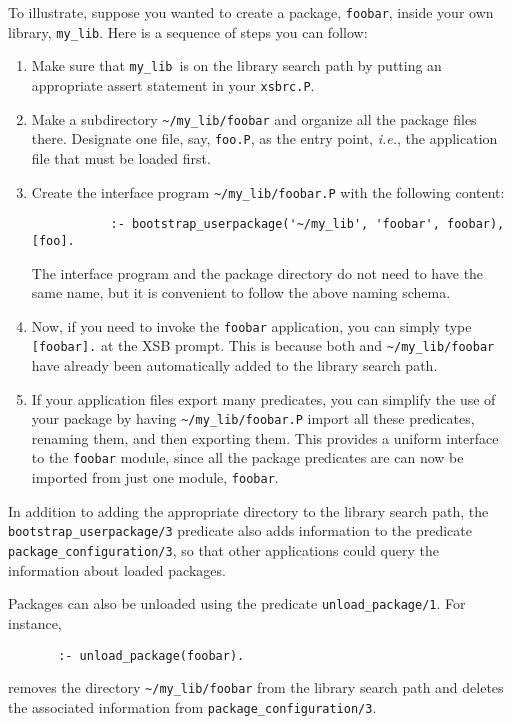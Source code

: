 To illustrate, suppose you wanted to create a package, {\tt foobar}, inside
your own library, {\tt my\_lib}. Here is a sequence of steps you can
follow:  
\begin{enumerate}
\item Make sure that {\tt my\_lib}\ is on the library search path by putting
  an appropriate assert statement in your {\tt xsbrc.P}.
\item Make a subdirectory \verb|~/my_lib/foobar| and organize all the
  package files there. Designate one file, say, {\tt foo.P}, as the
  entry point, {\it i.e.}, the application file that must be loaded first.
\item Create the interface program \verb|~/my_lib/foobar.P| with the
  following content:
    \begin{verbatim}
           :- bootstrap_userpackage('~/my_lib', 'foobar', foobar), [foo].
    \end{verbatim}
  The interface program and the package directory do not need to have the
  same name, but it is convenient to follow the above naming schema.
\item Now, if you need to invoke the {\tt foobar} application, you can
  simply type \verb|[foobar].| at the XSB prompt. This is because both and
  \verb|~/my_lib/foobar| have already been automatically added to the
  library search path.
\item If your application files export many predicates, you can simplify
  the use of your package by having \verb|~/my_lib/foobar.P| import all
  these predicates, renaming them, and then exporting them. This provides a
  uniform interface to the {\tt foobar} module, since all the package
  predicates are can now be imported from just one module, {\tt foobar}.
\end{enumerate}
In addition to adding the appropriate directory to the library search
path, the \verb|bootstrap_userpackage/3| predicate also adds
information to the predicate \verb|package_configuration/3|, so that
other applications could query the information about loaded packages.

Packages can also be unloaded using the predicate
\verb|unload_package/1|. For instance, 

\begin{verbatim}
       :- unload_package(foobar).  
\end{verbatim}
removes the directory \verb|~/my_lib/foobar| from the library search path
and deletes the associated information from \verb|package_configuration/3|.

